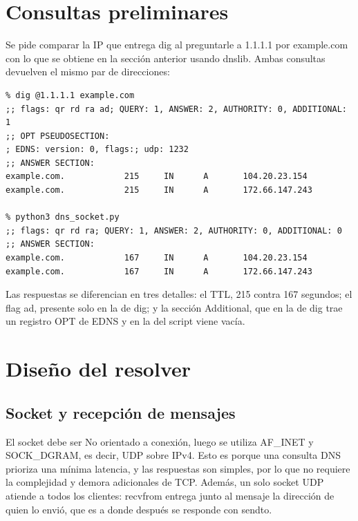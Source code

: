 \documentclass[
	spanish, %
	letterpaper, oneside
]{article}
\begin{document}
\templatePortrait

\templatePagecfg


\templateIndex

\templateFinalcfg


\section{Consultas preliminares}
Se pide comparar la IP que entrega dig al preguntarle a 1.1.1.1 por example.com con lo que se obtiene en la sección anterior usando dnslib. Ambas consultas devuelven el mismo par de direcciones:

\begin{verbatim}
% dig @1.1.1.1 example.com
;; flags: qr rd ra ad; QUERY: 1, ANSWER: 2, AUTHORITY: 0, ADDITIONAL: 1
;; OPT PSEUDOSECTION:
; EDNS: version: 0, flags:; udp: 1232
;; ANSWER SECTION:
example.com.            215     IN      A       104.20.23.154
example.com.            215     IN      A       172.66.147.243

% python3 dns_socket.py
;; flags: qr rd ra; QUERY: 1, ANSWER: 2, AUTHORITY: 0, ADDITIONAL: 0
;; ANSWER SECTION:
example.com.            167     IN      A       104.20.23.154
example.com.            167     IN      A       172.66.147.243
\end{verbatim}

Las respuestas se diferencian en tres detalles: el TTL, 215 contra 167 segundos; el flag ad, presente solo en la de dig; y la sección Additional, que en la de dig trae un registro OPT de EDNS y en la del script viene vacía.

\section{Diseño del resolver}

\subsection{Socket y recepción de mensajes}
El socket debe ser No orientado a conexión, luego se utiliza AF\_INET y SOCK\_DGRAM, es decir, UDP sobre IPv4. Esto es porque una consulta DNS prioriza una mínima latencia, y las respuestas son simples, por lo que no requiere la complejidad y demora adicionales de TCP. Además, un solo socket UDP atiende a todos los clientes: recvfrom entrega junto al mensaje la dirección de quien lo envió, que es a donde después se responde con sendto.
\end{document}
